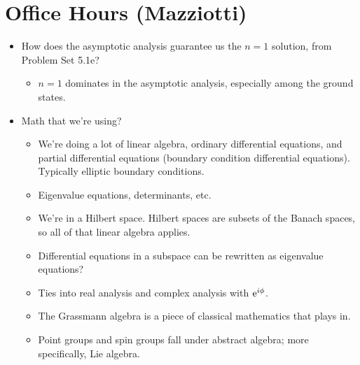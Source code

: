 \documentclass[../notes.tex]{subfiles}
\begin{document}
\section{Office Hours (Mazziotti)}
\begin{itemize}
    \item How does the asymptotic analysis guarantee us the $n=1$ solution, from Problem Set 5.1e?
    \begin{itemize}
        \item $n=1$ dominates in the asymptotic analysis, especially among the ground states.
    \end{itemize}
    \item Math that we're using?
    \begin{itemize}
        \item We're doing a lot of linear algebra, ordinary differential equations, and partial differential equations (boundary condition differential equations). Typically elliptic boundary conditions.
        \item Eigenvalue equations, determinants, etc.
        \item We're in a Hilbert space. Hilbert spaces are subsets of the Banach spaces, so all of that linear algebra applies.
        \item Differential equations in a subspace can be rewritten as eigenvalue equations?
        \item Ties into real analysis and complex analysis with $\e[i\phi]$.
        \item The Grassmann algebra is a piece of classical mathematics that plays in.
        \item Point groups and spin groups fall under abstract algebra; more specifically, Lie algebra.
    \end{itemize}
\end{itemize}
\end{document}
